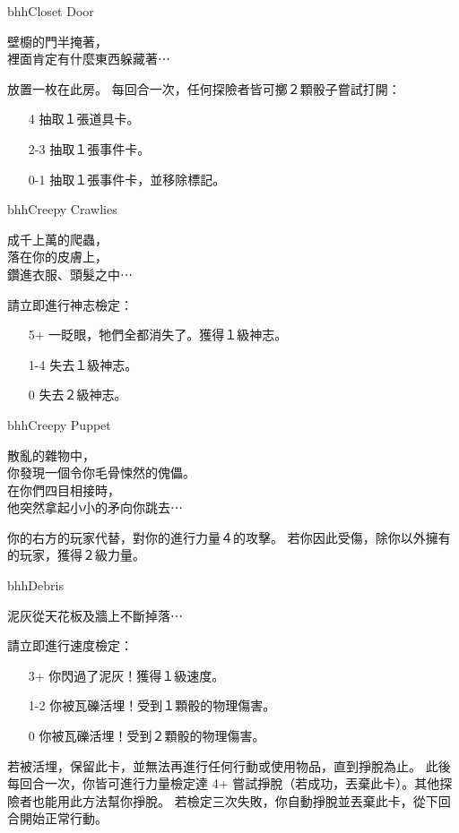 \linebreak[0]%
\begin{EventCard}{bhh}{Closet Door}
  \begin{CardStory}
    壁櫥的門半掩著，\\
    裡面肯定有什麼東西躲藏著⋯
  \end{CardStory}
  放置一枚在此房。\smallbreak
  每回合一次，任何探險者皆可擲２顆骰子嘗試打開：
  \begin{itemize}
    \item[4] 抽取１張道具卡。
    \item[2-3] 抽取１張事件卡。
    \item[0-1] 抽取１張事件卡，並移除標記。
  \end{itemize}
\end{EventCard}%
\linebreak[0]%
\begin{EventCard}{bhh}{Creepy Crawlies}
  \begin{CardStory}
    成千上萬的爬蟲，\\
    落在你的皮膚上，\\
    鑽進衣服、頭髮之中⋯
  \end{CardStory}
  請立即進行神志檢定：
  \begin{itemize}
    \item[5+] 一眨眼，牠們全都消失了。獲得１級神志。
    \item[1-4] 失去１級神志。
    \item[0] 失去２級神志。
  \end{itemize}
\end{EventCard}%
\linebreak[0]%
\begin{EventCard}{bhh}{Creepy Puppet}
  \begin{CardStory}
    散亂的雜物中，\\
    你發現一個令你毛骨悚然的傀儡。\\
    在你們四目相接時，\\
    他突然拿起小小的矛向你跳去⋯
  \end{CardStory}
  你的右方的玩家代替\ThisName{}，對你的進行力量４的攻擊。\smallbreak
  若你因此受傷，除你以外擁有的玩家，獲得２級力量。\smallbreak
\end{EventCard}%
\linebreak[0]%
\begin{EventCard}{bhh}{Debris}
  \begin{CardStory}
    泥灰從天花板及牆上不斷掉落⋯
  \end{CardStory}
  請立即進行速度檢定：
  \begin{itemize}
    \item[3+] 你閃過了泥灰！獲得１級速度。
    \item[1-2] 你被瓦礫活埋！受到１顆骰的物理傷害。
    \item[0] 你被瓦礫活埋！受到２顆骰的物理傷害。
  \end{itemize}
  若被活埋，保留此卡，並無法再進行任何行動或使用物品，直到掙脫為止。\smallbreak
  此後每回合一次，你皆可進行力量檢定達 4+ 嘗試掙脫（若成功，丟棄此卡）。其他探險者也能用此方法幫你掙脫。\smallbreak
  若檢定三次失敗，你自動掙脫並丟棄此卡，從下回合開始正常行動。\smallbreak
\end{EventCard}%
